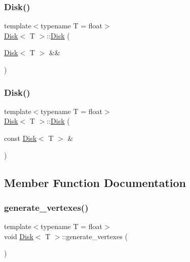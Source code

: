 \mbox{\label{classDisk_a893da931e3f39c126c434ab2fc2e12cc}} 
\subsubsection{\texorpdfstring{Disk()}{Disk()}\hspace{0.1cm}{\footnotesize\ttfamily [3/4]}}
{\footnotesize\ttfamily template$<$typename T  = float$>$ \\
\mbox{\hyperlink{classDisk}{Disk}}$<$ T $>$\+::\mbox{\hyperlink{classDisk}{Disk}} (\begin{DoxyParamCaption}\item[{\mbox{\hyperlink{classDisk}{Disk}}$<$ T $>$ \&\&}]{ }\end{DoxyParamCaption})\hspace{0.3cm}{\ttfamily [default]}}

\mbox{\label{classDisk_a96de79b2e115c478a33cc31f4818aee9}} 
\subsubsection{\texorpdfstring{Disk()}{Disk()}\hspace{0.1cm}{\footnotesize\ttfamily [4/4]}}
{\footnotesize\ttfamily template$<$typename T  = float$>$ \\
\mbox{\hyperlink{classDisk}{Disk}}$<$ T $>$\+::\mbox{\hyperlink{classDisk}{Disk}} (\begin{DoxyParamCaption}\item[{const \mbox{\hyperlink{classDisk}{Disk}}$<$ T $>$ \&}]{ }\end{DoxyParamCaption})\hspace{0.3cm}{\ttfamily [default]}}



\subsection{Member Function Documentation}
\mbox{\label{classDisk_a1588532798901180b1eef6f3e1fb83f6}} 
\subsubsection{\texorpdfstring{generate\+\_\+vertexes()}{generate\_vertexes()}\hspace{0.1cm}{\footnotesize\ttfamily [1/2]}}
{\footnotesize\ttfamily template$<$typename T  = float$>$ \\
void \mbox{\hyperlink{classDisk}{Disk}}$<$ T $>$\+::generate\+\_\+vertexes (\begin{DoxyParamCaption}{ }\end{DoxyParamCaption})\hspace{0.3cm}{\ttfamily [private]}}

